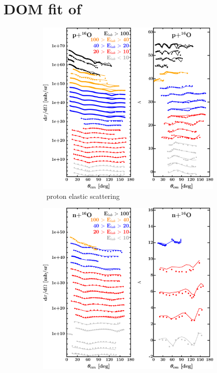 \section{DOM fit of \oSix}
\label{o16DOMOutput}
\begin{figure}[hbtp]
    \captionsetup[subfigure]{labelformat=empty}
    \centering
    \begin{subfigure}[c]{0.39\textheight}
        \centering
        \includegraphics[width=\linewidth]{figures/o16_protonElastic.png}
        \caption{\oSix\ proton elastic scattering}
        \label{DOMFitData_o16_proton_elastic}
    \end{subfigure}\hspace{6pt}
    \begin{subfigure}[c]{0.39\textheight}
        \centering
        \includegraphics[width=0.52\linewidth]{figures/o16_neutronElastic.png}

\end{subfigure}
\end{figure}
